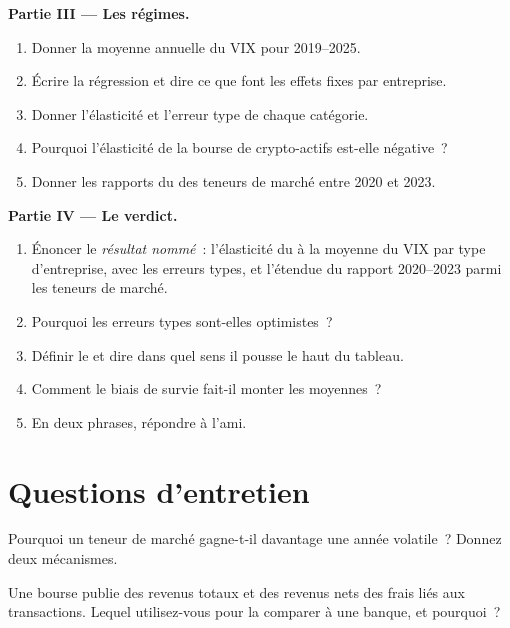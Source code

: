 \begin{problem}
\medskip\noindent\textbf{Partie III --- Les régimes.}
\begin{enumerate}[resume]
\item Donner la moyenne annuelle du VIX pour 2019--2025.
\item Écrire la régression et dire ce que font les effets fixes par entreprise.
\item Donner l'élasticité et l'erreur type de chaque catégorie.
\item Pourquoi l'élasticité de la bourse de crypto-actifs est-elle négative~?
\item Donner les rapports du  des teneurs de marché entre 2020 et 2023.
\end{enumerate}

\medskip\noindent\textbf{Partie IV --- Le verdict.}
\begin{enumerate}[resume]
\item Énoncer le \emph{résultat nommé}~: l'élasticité du  à la moyenne du VIX par type d'entreprise, avec
les erreurs types, et l'étendue du rapport 2020--2023 parmi les teneurs de marché.
\item Pourquoi les erreurs types sont-elles optimistes~?
\item Définir le  et dire dans quel sens il pousse le haut du tableau.
\item Comment le biais de survie fait-il monter les moyennes~?
\item En deux phrases, répondre à l'ami.
\end{enumerate}
\end{problem}

\section{Questions d'entretien}

\begin{interviewq}\label{iq:in:revenue-and-profit-across-the-industry:1}
Pourquoi un teneur de marché gagne-t-il davantage une année volatile~? Donnez deux mécanismes.
\end{interviewq}

\begin{interviewq}\label{iq:in:revenue-and-profit-across-the-industry:2}
Une bourse publie des revenus totaux et des revenus nets des frais liés aux transactions. Lequel utilisez-vous pour la comparer à une
banque, et pourquoi~?
\end{interviewq}


